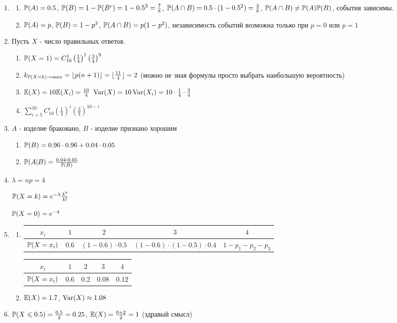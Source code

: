 \begin{enumerate}
\item
\begin{enumerate}
\item $\P(A)=0.5$, $\P(B)=1-\P(B^{c})=1-0.5^{3}=\frac{7}{8}$, $\P(A\cap
B)=0.5\cdot (1-0.5^{2})=\frac{3}{8}$, $\P(A\cap B)\neq \P(A)\P(B)$,
события зависимы.
\item $\P(A)=p$, $\P(B)=1-p^{3}$, $\P(A\cap B)=p(1-p^{2})$,
независимость событий возможна только при $p=0$ или $p=1$
\end{enumerate}
\item  Пусть $X$ - число правильных ответов.
\begin{enumerate}
\item $\P(X=1)=C_{10}^{1}\left(\frac{1}{4}\right)^{1}\left(\frac{3}{4}\right)^{9}$
\item $k_{\P(X=k)\rightarrow \max}=\lfloor p(n+1)\rfloor=\lfloor
\frac{11}{4}\rfloor=2$ (можно не зная формулы просто выбрать
наибольшую вероятность)
\item $\E(X)=10\E(X_{i})=\frac{10}{4}$
$\Var(X)=10\Var(X_{i})=10 \cdot \frac{1}{4} \cdot \frac{3}{4}$
\item $\sum_{i=5}^{10}C_{10}^{i}\left(\frac{1}{4}\right)^{i}\left(\frac{3}{4}\right)^{10-i}$
\end{enumerate}
\item $A$ - изделие браковано, $B$ - изделие признано хорошим
\begin{enumerate}
\item $\P(B)=0.96\cdot 0.96+0.04\cdot 0.05$
\item $\P(A|B)=\frac{0.04\cdot 0.05}{\P(B)}$
\end{enumerate}
\item  $\lambda=np=4$

$\P(X=k)=e^{-\lambda}\frac{\lambda^{k}}{k!}$

$\P(X=0)=e^{-4}$
\item
\begin{enumerate}
\item
\begin{tabular}{@{}ccccc@{}}
\toprule
$x_i$       & $1$   & $2$               & $3$                           & $4$             \\ \midrule
$\P(X=x_i)$ & $0.6$ & $(1-0.6)\cdot0.5$ & $(1-0.6)\cdot(1-0.5)\cdot0.4$ & $1-p_1-p_2-p_3$ \\ \bottomrule
\end{tabular}

\begin{tabular}{@{}ccccc@{}}
\toprule
$x_i$       & $1$   & $2$   & $3$    & $4$    \\ \midrule
$\P(X=x_i)$ & $0.6$ & $0.2$ & $0.08$ & $0.12$ \\ \bottomrule
\end{tabular}
\item $\E(X)=1.7$, $\Var(X)\approx 1.08$
\end{enumerate}
\item  $\P(X\le 0.5)=\frac{0.5}{2}=0.25$, $\E(X)=\frac{0+2}{2}=1$ (здравый смысл)


\end{enumerate}
